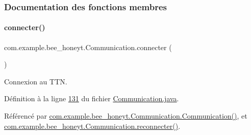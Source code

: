 \subsubsection{Documentation des fonctions membres}
\mbox{\label{classcom_1_1example_1_1bee__honeyt_1_1_communication_aadc176b28bce357bf655d0feec024013}} 
\paragraph{\texorpdfstring{connecter()}{connecter()}}
{\footnotesize\ttfamily com.\+example.\+bee\+\_\+honeyt.\+Communication.\+connecter (\begin{DoxyParamCaption}{ }\end{DoxyParamCaption})\hspace{0.3cm}{\ttfamily [private]}}



Connexion au T\+TN. 



Définition à la ligne \hyperlink{_communication_8java_source_l00131}{131} du fichier \hyperlink{_communication_8java_source}{Communication.\+java}.



Référencé par \hyperlink{_communication_8java_source_l00063}{com.\+example.\+bee\+\_\+honeyt.\+Communication.\+Communication()}, et \hyperlink{_communication_8java_source_l00174}{com.\+example.\+bee\+\_\+honeyt.\+Communication.\+reconnecter()}.


